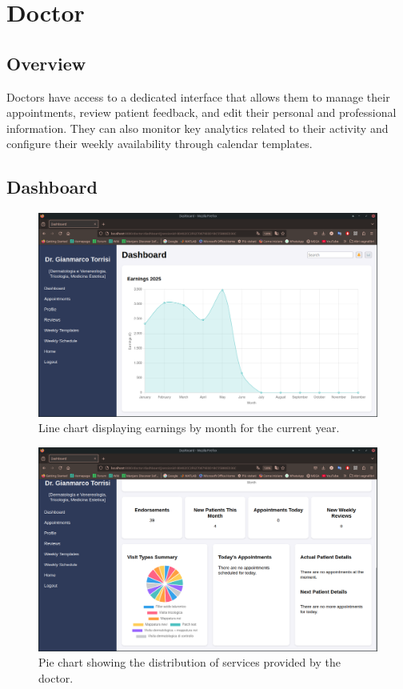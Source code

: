 \section{Doctor}

\subsection{Overview}
Doctors have access to a dedicated interface that allows them to manage their appointments, review patient feedback, and edit their personal and professional information. They can also monitor key analytics related to their activity and configure their weekly availability through calendar templates.

\subsection{Dashboard}

\begin{figure}[!h]
	\centering
	\includegraphics[scale=0.30]{resources/screenshots/doctor_ui/earnings_linechart.png}
	\caption{Line chart displaying earnings by month for the current year.}
	\label{fig:earnings_linechart}
\end{figure}

\begin{figure}[!h]
	\centering
	\includegraphics[scale=0.30]{resources/screenshots/doctor_ui/dashboard_bottom.png}
	\caption{Pie chart showing the distribution of services provided by the doctor.}
	\label{fig:services_piechart}
\end{figure}

